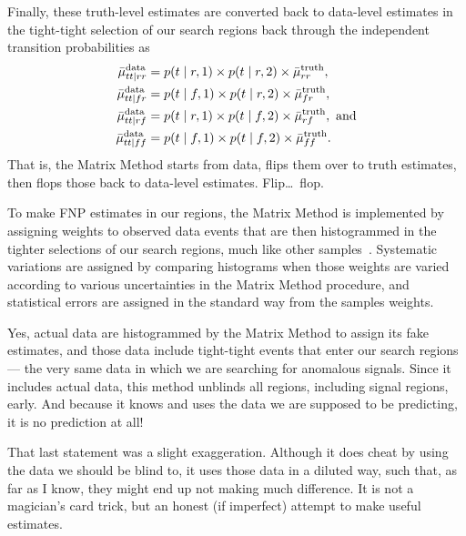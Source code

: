 Finally, these truth-level estimates are converted back to data-level
estimates in the tight-tight selection of our search regions back through the
independent transition probabilities as
\begin{align}
\bar \mu^\textrm{data}_{tt\mid rr} &=
p(t \mid r,1)
\times p(t \mid r,2)
\times \bar \mu^\textrm{truth}_{rr}, \\
\bar \mu^\textrm{data}_{tt\mid fr} &=
p(t \mid f,1)
\times p(t \mid r,2)
\times \bar \mu^\textrm{truth}_{fr}, \\
\bar \mu^\textrm{data}_{tt\mid rf} &=
p(t \mid r,1)
\times p(t \mid f,2)
\times \bar \mu^\textrm{truth}_{rf},~\textrm{and} \\
\bar \mu^\textrm{data}_{tt\mid ff} &=
p(t \mid f,1)
\times p(t \mid f,2)
\times \bar \mu^\textrm{truth}_{ff}.
\end{align}
That is, the Matrix Method starts from data, flips them over to truth
estimates, then flops those back to data-level estimates.
Flip\ldots\ flop.

To make FNP estimates in our regions, the Matrix Method is
implemented by assigning weights to observed data events that are then
histogrammed in the tighter selections of our search regions,
much like other samples~\cite{twoljets2018int}.
Systematic variations are assigned by comparing histograms when those weights
are varied according to various uncertainties in the Matrix Method procedure,
and statistical errors are assigned in the standard way from the samples
weights.

Yes, actual data are histogrammed by the Matrix Method to assign its fake
estimates, and those data include tight-tight events that enter our search
regions --- the very same data in which we are searching for anomalous signals.
Since it includes actual data, this method unblinds all regions,
including signal regions, early.
And because it knows and uses the data we are supposed to be predicting, it is
no prediction at all!

That last statement was a slight exaggeration.
Although it does cheat by using the data we should be blind to, it uses those
data in a diluted way, such that, as far as I know, they might end up not
making much difference.
It is not a magician's card trick, but an honest (if imperfect) attempt to make
useful estimates.

